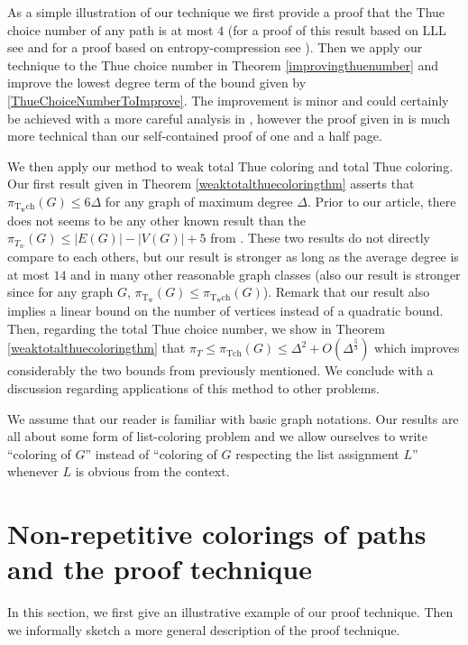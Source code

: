 \documentclass[a4paper,10pt]{article}
\begin{document}
As a simple illustration of our technique we first provide a proof that the Thue choice number of any path is at most $4$ (for a proof of this result based on LLL see \cite{doi:10.1002/rsa.20347} and for a proof based on entropy-compression see \cite{10.1002/rsa.20411}).
Then we apply our technique to the Thue choice number in Theorem \ref{improvingthuenumber} and improve the lowest degree term of the bound given by \eqref{ThueChoiceNumberToImprove}. The  improvement is minor and could certainly be achieved with a more careful analysis in \cite{MontassierEntropie}, however the proof given in  \cite{MontassierEntropie} is much more technical than our self-contained proof of one and a half page.

We then apply our method to weak total Thue coloring and total Thue coloring. Our first result given in  Theorem \ref{weaktotalthuecoloringthm} asserts that $\pi_{\operatorname{T_wch}}(G)\le6\Delta$ for any graph of maximum degree $\Delta$. Prior to our article, there does not seems to be any other known result than the $\pi_{T_w}(G)\le |E(G)|-|V(G)|+5$ from \cite{introthuetotalcol}. These two results do not directly compare to each others, 
but our result is stronger as long as the average degree is at most $14$ and in many other reasonable graph classes (also our result is stronger since for any graph $G$,  $\pi_{\operatorname{T_w}}(G)\le\pi_{\operatorname{T_wch}}(G)$).
Remark that our result also implies a linear bound on the number of vertices instead of a quadratic bound.
Then, regarding the total Thue choice number, we show in Theorem \ref{weaktotalthuecoloringthm} that $\pi_{T}\le\pi_{\operatorname{Tch}}(G)\le\Delta^2+O(\Delta^\frac{5}{3})$ which improves considerably the two bounds from \cite{introthuetotalcol} previously mentioned.
We conclude with a discussion regarding applications of this method to other problems.

We assume that our reader is familiar with basic graph notations.
Our results are all about some form of list-coloring problem and we allow ourselves to write ``coloring of $G$'' instead of ``coloring of $G$ respecting the list assignment $L$'' whenever $L$ is obvious from the context.



\section{Non-repetitive colorings of paths and the proof technique} 
In this section, we first give an illustrative example of our proof technique. 
Then we informally sketch a more general description of the proof technique.
\end{document}

